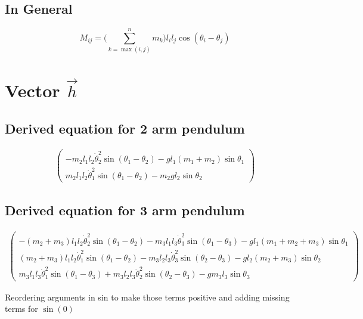 \documentclass[11pt,a4paper]{article}
\begin{document}
\subsection{In General}
$$
M_{ij} = \Big( \sum_{k = \max(i,j)}^{n}{m_k} \Big) l_i l_j \cos(\theta_i - \theta_j)
$$

\section{Vector $\vec{h}$}

\subsection{Derived equation for 2 arm pendulum}
\begin{align}
    \begin{pmatrix}
    - m_2 l_1 l_2 \dot{\theta}_2^2 \sin(\theta_1 - \theta_2) - g l_1 (m_1 + m_2) \sin\theta_1  \\
    m_2 l_1 l_2 \dot{\theta}_1^2 \sin(\theta_1 - \theta_2) - m_2 g l_2 \sin\theta_2
    \end{pmatrix}
\end{align}

\subsection{Derived equation for 3 arm pendulum}
\begin{align}
    \begin{pmatrix}
        -(m_2 + m_3) l_1 l_2 \dot{\theta}_2^2 \sin(\theta_1 - \theta_2) - m_3 l_1 l_3 \dot{\theta}_3^2 \sin(\theta_1 - \theta_3) - g l_1 (m_1 + m_2 + m_3) \sin\theta_1 \\[1ex]
        (m_2 + m_3) l_1 l_2 \dot{\theta}_1^2 \sin(\theta_1 - \theta_2) - m_3 l_2 l_3 \dot{\theta}_3^2 \sin(\theta_2 - \theta_3) - g l_2 (m_2 + m_3) \sin\theta_2 \\[1ex]
        m_3 l_1 l_3 \dot{\theta}_1^2 \sin(\theta_1 - \theta_3) + m_3 l_2 l_3 \dot{\theta}_2^2 \sin(\theta_2 - \theta_3) - g m_3 l_3 \sin\theta_3
    \end{pmatrix}
\end{align}

Reordering arguments in sin to make those terms positive and adding missing terms for $\sin(0)$
\end{document}
